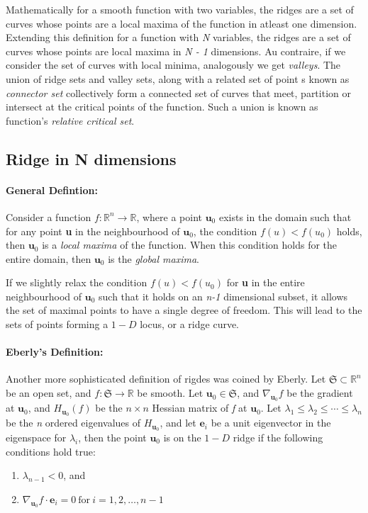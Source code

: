 Mathematically for a smooth function with two variables, the ridges are a set of curves whose points are a local maxima of the function in atleast one dimension. Extending this definition for a function with \textit{N} variables, the ridges are a set of curves whose points are local maxima in \textit{N - 1} dimensions. Au contraire, if we consider the set of curves with local minima, analogously we get \textit{valleys}. The union of ridge sets and valley sets, along with a related set of point s known as \textit{connector set} collectively form a connected set of curves that meet, partition or intersect at the critical points of the function. Such a union is known as function's \textit{relative critical set}.

\subsection{Ridge in N dimensions}
\paragraph{General Defintion:}Consider a function $\textit{f}: \mathbb{R}^{n} \rightarrow \mathbb{R}$, where a point $\textbf{u}_{0}$ exists in the domain such that for any point \textbf{u} in the neighbourhood of $\textbf{u}_{0}$, the condition $f(u) < f(u_{0})$ holds, then $ \textbf{u}_{0} $ is a \textit{local maxima} of the function. When this condition holds for the entire domain, then $\textbf{u}_{0}$ is the \textit{global maxima}.

If we slightly relax the condition $f(u) < f(u_{0})$ for \textbf{u} in the entire neighbourhood of $\textbf{u}_{0}$ such that it holds on an \textit{n-1} dimensional subset, it allows the set of maximal points to have a single degree of freedom. This will lead to the sets of points forming a $1-D$ locus, or a ridge curve. 

\paragraph{Eberly's Definition:} Another more sophisticated definition of rigdes was coined by Eberly. Let $ \mathfrak{S} \subset \mathbb{R}^{n} $ be an open set, and $ f: \mathfrak{S} \rightarrow \mathbb{R} $ be smooth. Let $ \textbf{u}_{0} \in \mathfrak{S}$, and $ \nabla_{\textbf{u}_{0}} f $ be the gradient at $\textbf{u}_{0}$, and $ H_{\textbf{u}_{0}}(f) $ be the $n\times n $ Hessian matrix of \textit{f} at $ \textbf{u}_{0} $. Let $ \lambda_{1} \leq \lambda_{2} \leq \cdots \leq \lambda_{n} $ be the \textit{n} ordered eigenvalues of $ H_{\textbf{u}_{0}} $, and let $ \textbf{e}_{i}$ be a unit eigenvector in the eigenspace for $ \lambda_{i}$, then the point $ \textbf{u}_{0} $ is on the $1-D$ ridge if the following conditions hold true:
\begin{enumerate}
	\item $\lambda_{n-1} < 0$, and
	\item $ \nabla_{\textbf{u}_{0}} f \cdot \textbf{e}_{i} = 0 \ \text{for} \ i = 1,2,\ldots,n-1 $
\end{enumerate}

